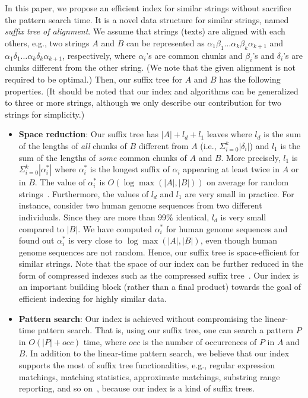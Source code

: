 \documentclass{llncs}
\newcommand{\partitle}[1]{}                        \newcommand{\commentout}[1]{}
\newcommand{\bi}{\begin{itemize}}
\newcommand{\ei}{\end{itemize}}
\begin{document}
\partitle{Our contribution}
In this paper, we propose an efficient index for similar strings
without sacrifice the pattern search time.
It is  a novel data structure for similar strings,
 named {\em suffix tree of alignment}.
We assume that strings (texts) are aligned with each others, e.g.,
 two strings $A$ and $B$ can be represented as
 $\alpha_1 \beta_1 \ldots \alpha_k \beta_k \alpha_{k+1}$ and
 $\alpha_1 \delta_1 \ldots \alpha_k \delta_k \alpha_{k+1}$, respectively,
 where $\alpha_i$'s are common chunks and
  $\beta_i$'s and $\delta_i$'s are chunks different from the other string.
(We note that the given alignment is not required to be optimal.)
Then, our suffix tree for $A$ and $B$
 has the following properties.
(It should be noted that our index and algorithms can be generalized to three or more strings,
although we only describe our contribution for two strings
for simplicity.)
\bi
\item {\bf Space reduction}:
Our suffix tree has $|A| + l_d + l_1$ leaves
 where $l_d$ is the sum of the lengths of {\em all} chunks of $B$ different from $A$
 (i.e., $\Sigma_{i=0}^{k} |\delta_i|$)
 and $l_1$ is the sum of the lengths of {\em some} common chunks of $A$ and $B$.
More precisely, $l_1$ is $\Sigma_{i=0}^{k} |\alpha^{*}_i|$
 where $\alpha^{*}_i$ is the longest suffix of $\alpha_i$ appearing at least twice in $A$ or in $B$.
The value of $\alpha^{*}_i$ is $O(\log \max(|A|,|B|))$ on average for random
 strings~\cite{karlin1983new}.
Furthermore, the values of $l_d$ and $l_1$ are very small in practice.
For instance, consider
two human genome sequences from two different individuals.
Since they are more than 99\% identical,
$l_d$ is very small compared to $|B|$.
We have computed $\alpha^{*}_i$ for human genome sequences
and found out $\alpha^{*}_i$ is very close to $\log \max(|A|,|B|)$,
even though human genome sequences are not random.
Hence, our suffix tree is space-efficient for similar strings.
Note that the space of our index can be further reduced
 in the form of compressed indexes
 such as the compressed suffix tree~\cite{Grossi&Vitter:05,Sadakane07TCS}.
Our index is an important building block (rather than a final product)
 towards the goal of efficient indexing for highly similar data.
\item {\bf Pattern search}:
Our index is achieved without compromising the linear-time pattern search.
That is, using our suffix tree, one can search a pattern $P$ in $O(|P|+occ)$ time,
 where $occ$ is the number of occurrences of $P$ in $A$ and $B$.
In addition to the linear-time pattern search,
 we believe that our index supports the most of suffix tree functionalities,
 e.g., regular expression matchings, matching statistics, approximate matchings,
 substring range reporting,
 and so on~\cite{Baeza-Yates&Gonnet:96,Bille&Gortz:11,Gusfield:97},
 because our index is a kind of suffix trees.
\ei
\end{document}
